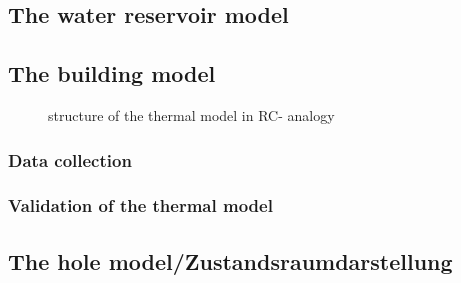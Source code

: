 
    \subsection{The water reservoir model}
    \label{waterModel}
    
    
    
    
    
    
    
 
    
   

    \subsection{The building model}
    \label{building model}

    \begin{figure}
            \centering
            \def\svgwidth{320pt}
            
            \caption{structure of the thermal model in RC- analogy}
            \label{fig:structureThermalModel}
        \end{figure}
    
    \subsubsection{Data collection}
    \label{datacollection}

    \subsubsection{Validation of the thermal model}
    \label{validationthermalmodel}

    \subsection{The hole model/Zustandsraumdarstellung}
    \label{holeModel}

